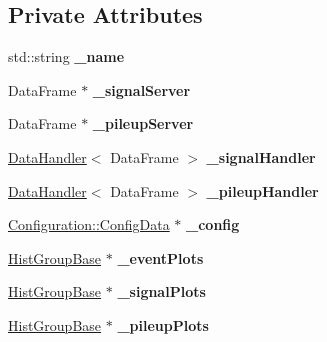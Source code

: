 \subsection*{Private Attributes}
\begin{CompactItemize}
\item 
\hypertarget{classUserAnalysisBase_934fd6c702d2c9cea4919180765e4338}{
std::string \textbf{\_\-name}}
\label{classUserAnalysisBase_934fd6c702d2c9cea4919180765e4338}

\item 
\hypertarget{classUserAnalysisBase_4f08dbcc65695fb43561f4061c277f44}{
Data\-Frame $\ast$ \textbf{\_\-signal\-Server}}
\label{classUserAnalysisBase_4f08dbcc65695fb43561f4061c277f44}

\item 
\hypertarget{classUserAnalysisBase_9378b2c995b0e908ccd9e5f54a9a9f6e}{
Data\-Frame $\ast$ \textbf{\_\-pileup\-Server}}
\label{classUserAnalysisBase_9378b2c995b0e908ccd9e5f54a9a9f6e}

\item 
\hypertarget{classUserAnalysisBase_aafb0fb402abcd60b2ca6c8ee25d6d0f}{
\hyperlink{structDataHandler}{Data\-Handler}$<$ Data\-Frame $>$ \textbf{\_\-signal\-Handler}}
\label{classUserAnalysisBase_aafb0fb402abcd60b2ca6c8ee25d6d0f}

\item 
\hypertarget{classUserAnalysisBase_efcf3644a6707780e4c5c871e7808389}{
\hyperlink{structDataHandler}{Data\-Handler}$<$ Data\-Frame $>$ \textbf{\_\-pileup\-Handler}}
\label{classUserAnalysisBase_efcf3644a6707780e4c5c871e7808389}

\item 
\hypertarget{classUserAnalysisBase_d627c6cdd2b763dc682c92414a0fd151}{
\hyperlink{classConfiguration_1_1ConfigData}{Configuration::Config\-Data} $\ast$ \textbf{\_\-config}}
\label{classUserAnalysisBase_d627c6cdd2b763dc682c92414a0fd151}

\item 
\hypertarget{classUserAnalysisBase_c02c1e39847f4815f49947becd7ae75d}{
\hyperlink{classHistGroupBase}{Hist\-Group\-Base} $\ast$ \textbf{\_\-event\-Plots}}
\label{classUserAnalysisBase_c02c1e39847f4815f49947becd7ae75d}

\item 
\hypertarget{classUserAnalysisBase_ad04a821a2ce1e1c780c6ffa5411fd83}{
\hyperlink{classHistGroupBase}{Hist\-Group\-Base} $\ast$ \textbf{\_\-signal\-Plots}}
\label{classUserAnalysisBase_ad04a821a2ce1e1c780c6ffa5411fd83}

\item 
\hypertarget{classUserAnalysisBase_1373a10f46c223e6672ac5f5372f4d43}{
\hyperlink{classHistGroupBase}{Hist\-Group\-Base} $\ast$ \textbf{\_\-pileup\-Plots}}
\label{classUserAnalysisBase_1373a10f46c223e6672ac5f5372f4d43}

\end{CompactItemize}



